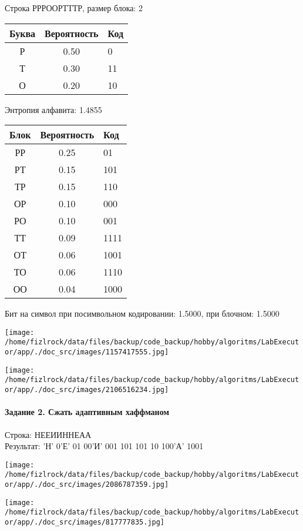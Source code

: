 \documentclass[a4paper, 12pt]{article}
\begin{document}
Строка РРРООРТТТР, размер блока: 2
\begin{center}
 \begin{tabular}{ |c|c|l| } 
  \hline
     Буква & Вероятность & Код\\ \hline
Р & 0.50 & 0\\\hline
Т & 0.30 & 11\\\hline
О & 0.20 & 10
\\ \hline \end{tabular}
\end{center}
Энтропия алфавита: 1.4855
\begin{center}
 \begin{tabular}{ |c|c|l| } 
  \hline
     Блок & Вероятность & Код\\ \hline
РР & 0.25 & 01\\\hline
РТ & 0.15 & 101\\\hline
ТР & 0.15 & 110\\\hline
ОР & 0.10 & 000\\\hline
РО & 0.10 & 001\\\hline
ТТ & 0.09 & 1111\\\hline
ОТ & 0.06 & 1001\\\hline
ТО & 0.06 & 1110\\\hline
ОО & 0.04 & 1000
\\ \hline \end{tabular}
\end{center}
Бит на символ при посимвольном кодировании: 1.5000, при блочном: 1.5000

\texttt{[image: /home/fizlrock/data/files/backup/code\_backup/hobby/algoritms/LabExecutor/app/./doc\_src/images/1157417555.jpg]}

\texttt{[image: /home/fizlrock/data/files/backup/code\_backup/hobby/algoritms/LabExecutor/app/./doc\_src/images/2106516234.jpg]}
\pagebreak
\paragraph{Задание 2. Сжать адаптивным хаффманом\\}

Строка: 
НЕЕИИННЕАА\\
Результат: 'Н' 0'Е' 01 00'И' 001 101 101 10 100'А' 1001

\texttt{[image: /home/fizlrock/data/files/backup/code\_backup/hobby/algoritms/LabExecutor/app/./doc\_src/images/2086787359.jpg]}

\texttt{[image: /home/fizlrock/data/files/backup/code\_backup/hobby/algoritms/LabExecutor/app/./doc\_src/images/817777835.jpg]}
\end{document}
